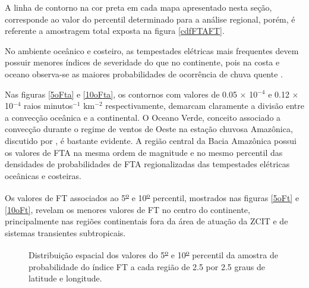 A linha de contorno na cor preta em cada mapa apresentado nesta seção, corresponde ao valor do percentil determinado para a análise regional, porém, é referente a amostragem total exposta na figura \ref{cdfFTAFT}.

No ambiente oceânico e costeiro, as tempestades elétricas mais frequentes devem possuir menores índices de severidade do que no continente, pois na costa e oceano observa-se as maiores probabilidades de ocorrência de chuva quente \cite{Liu2009}. 

Nas figuras \ref{5oFta} e \ref{10oFta}, os contornos com valores de 0.05 $\times$ 10$^{-4}$ e 0.12 $\times$ 10$^{-4}$ raios minutos$^{-1}$
km$^{-2}$ respectivamente, demarcam claramente a divisão entre a convecção oceânica e a continental. O Oceano Verde, conceito associado a convecção durante o regime de ventos de Oeste na estação chuvosa Amazônica, discutido por , é bastante evidente. A região central da Bacia Amazônica possui os  valores de FTA na mesma ordem de magnitude e no mesmo percentil das densidades de probabilidades de FTA regionalizadas das tempestades elétricas oceânicas e costeiras.

Os valores de FT associados ao 5\textsuperscript{\underline{o}} e 10\textsuperscript{\underline{o}} percentil, mostrados nas figuras \ref{5oFt} e \ref{10oFt}, revelam os menores valores de FT no centro do continente, principalmente nas regiões continentais fora da área de atuação da ZCIT e de sistemas transientes subtropicais.

\begin{figure}[!ht]
  \caption{Distribuição espacial dos valores do 5\textsuperscript{\underline{o}} e 10\textsuperscript{\underline{o}} percentil da amostra de probabilidade do índice FT a cada região de 2.5 por 2.5 graus de latitude e longitude.}
\label{extremosInfFT}
\end{figure} 

